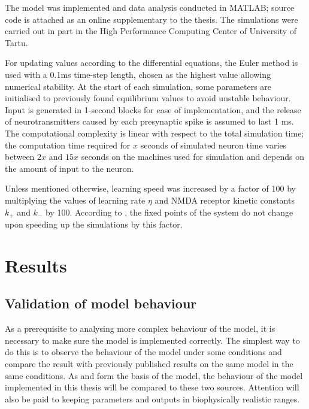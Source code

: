 \documentclass[a4paper,12pt]{report}
\theoremstyle{definition}
\begin{document}
The model was implemented and data analysis conducted in MATLAB; source code is attached as an online supplementary to the thesis. The simulations were carried out in part in the High Performance Computing Center of University of Tartu.

For updating values according to the differential equations, the Euler method is used with a 0.1ms time-step length, chosen as the highest value allowing numerical stability. At the start of each simulation, some parameters are initialised to previously found equilibrium values to avoid unstable behaviour. Input is generated in 1-second blocks for ease of implementation, and the release of neurotransmitters caused by each presynaptic spike is assumed to last 1 ms. The computational complexity is linear with respect to the total simulation time; the computation time required for $x$ seconds of simulated neuron time varies between $2x$ and $15x$ seconds on the machines used for simulation and depends on the amount of input to the neuron.

Unless mentioned otherwise, learning speed was increased by a factor of 100 by multiplying the values of learning rate $\eta$ and NMDA receptor kinetic constants $k_+$ and $k_-$ by 100. According to \cite{yeung2004synaptic}, the fixed points of the system do not change upon speeding up the simulations by this factor.












\chapter{Results}
\label{chapter:results}

\section{Validation of model behaviour}
\label{sec:validation}

As a prerequisite to analysing more complex behaviour of the model, it is necessary to make sure the model is implemented correctly. The simplest way to do this is to observe the behaviour of the model under some conditions and compare the result with previously published results on the same model in the same conditions. As \cite{shouval2002unified} and \cite{yeung2004synaptic} form the basis of the model, the behaviour of the model implemented in this thesis will be compared to these two sources. Attention will also be paid to keeping parameters and outputs in biophysically realistic ranges.
\end{document}
